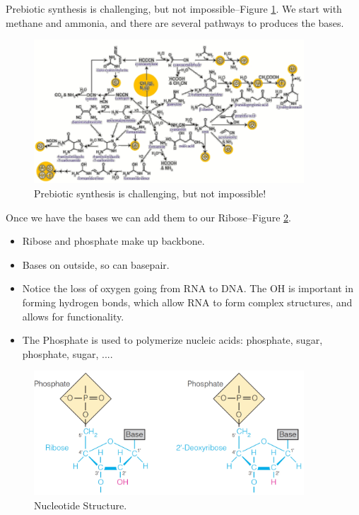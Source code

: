 \documentclass[]{article}
\begin{document}
{Prebiotic synthesis is challenging, but not impossible--Figure \ref{fig:PrebioticSynthesis}. We start with methane and ammonia, and there are several pathways to produces the bases.
\begin{figure}[H]
	\caption{Prebiotic synthesis is challenging, but not impossible!}\label{fig:PrebioticSynthesis} 
	\includegraphics[width=0.9\textwidth]{PrebioticSynthesis}
\end{figure}
Once we have the bases we can add them to our Ribose--Figure \ref{fig:NucleotideStructure}.
\begin{itemize}
	\item Ribose and phosphate make up backbone.
	\item Bases on outside, so can basepair.
	\item Notice the loss of oxygen going from RNA to DNA. The OH is important in forming hydrogen bonds, which allow RNA to form complex structures, and allows for functionality. 
	\item The Phosphate is used to polymerize nucleic acids: phosphate, sugar,  phosphate, sugar, ....
\end{itemize}
\begin{figure}[H]
	\caption{Nucleotide Structure.  }\label{fig:NucleotideStructure} 
	\includegraphics[width=0.9\textwidth]{NucleotideStructure}
\end{figure}


}
\end{document}
